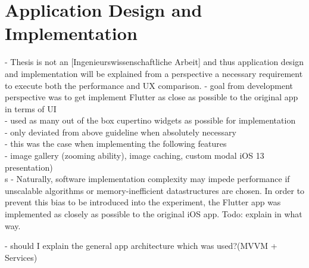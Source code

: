 \chapter{Application Design and Implementation}
- Thesis is not an [Ingenieurswissenschaftliche Arbeit] and thus application design and implementation will be explained from a perspective
a necessary requirement to execute both the performance and UX comparison.
- goal from development perspective was to get implement Flutter as close as possible to the original app in terms of UI\\
- used as many out of the box cupertino widgets as possible for implementation\\
- only deviated from above guideline when absolutely necessary\\
- this was the case when implementing the following features\\
- image gallery (zooming ability), image caching, custom modal iOS 13 presentation)\\s
- Naturally, software implementation complexity may impede performance if unscalable algorithms or memory-inefficient datastructures are chosen.
In order to prevent this bias to be introduced into the experiment, the Flutter app was implemented as closely as possible to the original iOS app. Todo: explain in what way.

- should I explain the general app architecture which was used?(MVVM + Services)\\

